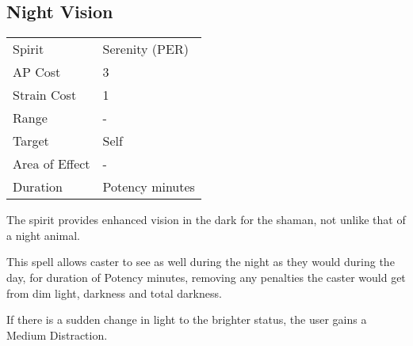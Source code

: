 \documentclass[11pt,a4paper,twocolumn]{book}
\begin{document}

\vfill

\subsection*{Night Vision}
{
	\begin{tabu} to 70mm{| X[l,4] | X[l,7] |}
		\hline
		Spirit         & Serenity (PER)  \\
		AP Cost        & 3               \\
		Strain Cost    & 1               \\
		Range          & -               \\
		Target         & Self            \\
		Area of Effect & -               \\
		Duration       & Potency minutes \\ \hline
	\end{tabu}
	
}

\medskip

The spirit provides enhanced vision in the dark for the shaman, not unlike that of a night animal.

This spell allows caster to see as well during the night as they would during the day, for duration of Potency minutes, removing any penalties the caster would get from dim light, darkness and total darkness. 

If there is a sudden change in light to the brighter status, the user gains a Medium Distraction.
\end{document}
